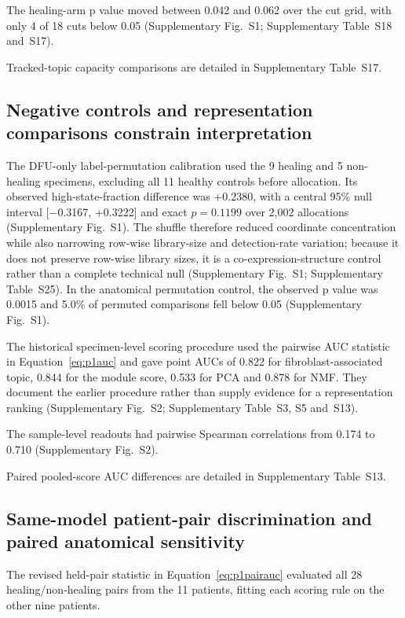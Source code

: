 \documentclass[10pt,a4paper]{article}
\begin{document}
The healing-arm p value moved between 0.042 and 0.062 over the cut grid, with only 4 of 18 cuts below 0.05 (Supplementary Fig.~S1; Supplementary Table~S18 and~S17).

Tracked-topic capacity comparisons are detailed in Supplementary Table~S17.

\subsection{Negative controls and representation comparisons constrain interpretation}

The DFU-only label-permutation calibration used the 9 healing and 5 non-healing specimens, excluding all 11 healthy controls before allocation. Its observed high-state-fraction difference was +0.2380, with a central 95\% null interval {[}−0.3167, +0.3222{]} and exact $p=0.1199$ over 2,002 allocations (Supplementary Fig.~S1). The shuffle therefore reduced coordinate concentration while also narrowing row-wise library-size and detection-rate variation; because it does not preserve row-wise library sizes, it is a co-expression-structure control rather than a complete technical null (Supplementary Fig.~S1; Supplementary Table~S25). In the anatomical permutation control, the observed p value was 0.0015 and 5.0\% of permuted comparisons fell below 0.05 (Supplementary Fig.~S1).

The historical specimen-level scoring procedure used the pairwise AUC statistic in Equation~\eqref{eq:p1auc} and gave point AUCs of 0.822 for fibroblast-associated topic, 0.844 for the module score, 0.533 for PCA and 0.878 for NMF. They document the earlier procedure rather than supply evidence for a representation ranking (Supplementary Fig.~S2\label{call:p1f7}; Supplementary Table~S3, S5 and~S13).

The sample-level readouts had pairwise Spearman correlations from 0.174 to 0.710 (Supplementary Fig.~S2).



Paired pooled-score AUC differences are detailed in Supplementary Table~S13.

\subsection{Same-model patient-pair discrimination and paired anatomical sensitivity}

The revised held-pair statistic in Equation~\eqref{eq:p1pairauc} evaluated all 28 healing/non-healing pairs from the 11 patients, fitting each scoring rule on the other nine patients.
\end{document}
